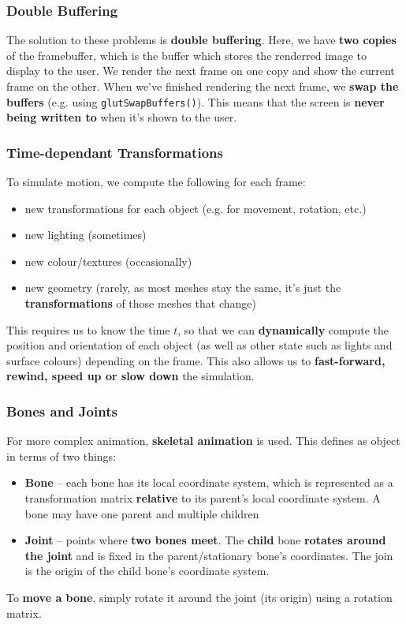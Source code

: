 \documentclass{article}
\begin{document}
\subsubsection{Double Buffering}

The solution to these problems is \textbf{double buffering}. Here, we have \textbf{two copies} of the framebuffer, which is the buffer which stores the renderred image to display to the user. We render the next frame on one copy and show the current frame on the other. When we've finished rendering the next frame, we \textbf{swap the buffers} (e.g. using \texttt{glutSwapBuffers()}). This means that the screen is \textbf{never being written to} when it's shown to the user.

\subsubsection{Time-dependant Transformations}

To simulate motion, we compute the following for each frame:
\begin{itemize}
	\item new transformations for each object (e.g. for movement, rotation, etc.)
	\item new lighting (sometimes)
	\item new colour/textures (occasionally)
	\item new geometry (rarely, as most meshes stay the same, it's just the \textbf{transformations} of those meshes that change)
\end{itemize}

This requires us to know the time $t$, so that we can \textbf{dynamically} compute the position and orientation of each object (as well as other state such as lights and surface colours) depending on the frame. This also allows us to \textbf{fast-forward, rewind, speed up or slow down} the simulation.

\subsubsection{Bones and Joints}

For more complex animation, \textbf{skeletal animation} is used. This defines as object in terms of two things:
\begin{itemize}
	\item \textbf{Bone} -- each bone has its local coordinate system, which is represented as a transformation matrix \textbf{relative} to its parent's local coordinate system. A bone may have one parent and multiple children
	\item \textbf{Joint} -- points where \textbf{two bones meet}. The \textbf{child} bone \textbf{rotates around the joint} and is fixed in the parent/stationary bone's coordinates. The join is the origin of the child bone's coordinate system.
\end{itemize}
To \textbf{move a bone}, simply rotate it around the joint (its origin) using a rotation matrix.
\end{document}
